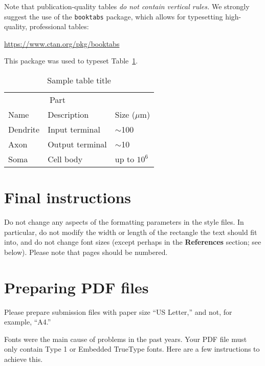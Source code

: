 \documentclass{article}
\begin{document}
Note that publication-quality tables \emph{do not contain vertical rules.} We
strongly suggest the use of the \verb+booktabs+ package, which allows for
typesetting high-quality, professional tables:
\begin{center}
  \url{https://www.ctan.org/pkg/booktabs}
\end{center}
This package was used to typeset Table~\ref{sample-table}.

\begin{table}
  \caption{Sample table title}
  \label{sample-table}
  \centering
  \begin{tabular}{lll}
    \toprule
    \multicolumn{2}{c}{Part}                   \\
    \cmidrule(r){1-2}
    Name     & Description     & Size ($\mu$m) \\
    \midrule
    Dendrite & Input terminal  & $\sim$100     \\
    Axon     & Output terminal & $\sim$10      \\
    Soma     & Cell body       & up to $10^6$  \\
    \bottomrule
  \end{tabular}
\end{table}

\section{Final instructions}

Do not change any aspects of the formatting parameters in the style files.  In
particular, do not modify the width or length of the rectangle the text should
fit into, and do not change font sizes (except perhaps in the
\textbf{References} section; see below). Please note that pages should be
numbered.

\section{Preparing PDF files}

Please prepare submission files with paper size ``US Letter,'' and not, for
example, ``A4.''

Fonts were the main cause of problems in the past years. Your PDF file must only
contain Type 1 or Embedded TrueType fonts. Here are a few instructions to
achieve this.
\end{document}
